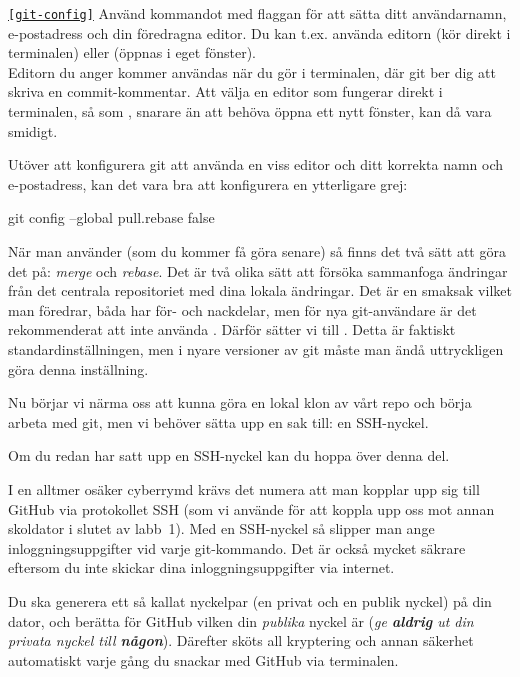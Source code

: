 \begin{Datorarbete}
\texttt{\ref{git-config}} Använd kommandot  med flaggan  för att sätta ditt användarnamn, e-postadress och din föredragna editor. Du kan t.ex. använda editorn  (kör direkt i terminalen) eller  (öppnas i eget fönster).
\\

Editorn du anger kommer användas när du gör  i terminalen, där git ber dig att skriva en commit-kommentar. Att välja en editor som fungerar direkt i terminalen, så som , snarare än att behöva öppna ett nytt fönster, kan då vara smidigt.

\item Utöver att konfigurera git att använda en viss editor och ditt korrekta namn och e-postadress, kan det vara bra att konfigurera en ytterligare grej:
\begin{Code}
git config --global pull.rebase false
\end{Code}
När man använder  (som du kommer få göra senare) så finns det två sätt att göra det på: \emph{merge} och \emph{rebase}. Det är två olika sätt att försöka sammanfoga ändringar från det centrala repositoriet med dina lokala ändringar. Det är en smaksak vilket man föredrar, båda har för- och nackdelar, men för nya git-användare är det rekommenderat att inte använda . Därför sätter vi  till . Detta är faktiskt standardinställningen, men i nyare versioner av git måste man ändå uttryckligen göra denna inställning.

\item Nu börjar vi närma oss att kunna göra en lokal klon av vårt repo och börja arbeta med git, men vi behöver sätta upp en sak till: en SSH-nyckel.

\halfblankline
Om du redan har satt upp en SSH-nyckel kan du hoppa över denna del.
\halfblankline

\noindent I en alltmer osäker cyberrymd krävs det numera att man kopplar upp sig till GitHub via protokollet SSH (som vi använde för att koppla upp oss mot annan skoldator i slutet av labb~1). Med en SSH-nyckel så slipper man ange inloggningsuppgifter vid varje git-kommando. Det är också mycket säkrare eftersom du inte skickar dina inloggningsuppgifter via internet.

Du ska generera ett så kallat nyckelpar (en privat och en publik nyckel) på din dator, och berätta för GitHub vilken din \emph{publika} nyckel är (\emph{ge \textbf{aldrig} ut din privata nyckel till \textbf{någon}}). Därefter sköts all kryptering och annan säkerhet automatiskt varje gång du snackar med GitHub via terminalen.



\end{Datorarbete}
